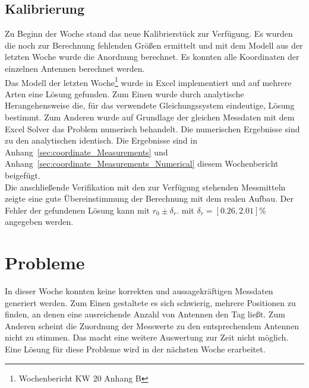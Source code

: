 \documentclass[a4paper,12pt,fleqn]{article}
\begin{document}
\subsection{Kalibrierung}
%
Zu Beginn der Woche stand das neue Kalibrierstück zur Verfügung. Es wurden die noch zur Berechnung fehlenden Größen ermittelt und mit dem Modell aus der letzten Woche wurde die Anordnung berechnet. Es konnten alle Koordinaten der einzelnen Antennen berechnet werden.\\
%
Das Modell der letzten Woche\footnote{Wochenbericht KW 20 Anhang B} wurde in Excel implementiert und auf mehrere Arten eine Lösung gefunden. Zum Einen wurde durch analytische Herangehensweise die, für das verwendete Gleichungssystem eindeutige, Lösung bestimmt. Zum Anderen wurde auf Grundlage der gleichen Messdaten mit dem Excel Solver das Problem numerisch behandelt. Die numerischen Ergebnisse sind zu den analytischen identisch. Die Ergebnisse sind in Anhang~\ref{sec:coordinate_Measurements} und Anhang~\ref{sec:coordinate_Measurements_Numerical} diesem Wochenbericht beigefügt.\\
%
Die anschließende Verifikation mit den zur Verfügung stehenden Messmitteln zeigte eine gute Übereinstimmung der Berechnung mit dem realen Aufbau. Der Fehler der gefundenen Lösung kann mit $r_0\pm\delta_r.$ mit $\delta_r=[0.26,2.01]\%$ angegeben werden.

\section{Probleme}
\label{sec:Problems}
In dieser Woche konnten keine korrekten und aussagekräftigen Messdaten generiert werden. Zum Einen gestaltete es sich schwierig, mehrere Positionen zu finden, an denen eine ausreichende Anzahl von Antennen den Tag ließt. Zum Anderen scheint die Zuordnung der Messwerte zu den entsprechendem Antennen nicht zu stimmen. Das macht eine weitere Auswertung zur Zeit nicht möglich. Eine Lösung für diese Probleme wird in der nächsten Woche erarbeitet.



\newpage

%
\end{document}
